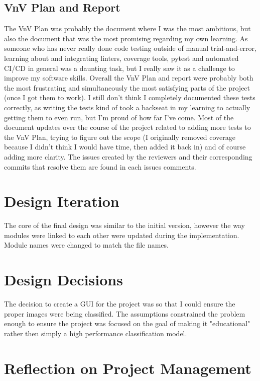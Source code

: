 \documentclass{article}
\begin{document}
\subsection{VnV Plan and Report}

The VnV Plan was probably the document where I was the most ambitious, but also the document that was the most promising
regarding my own learning. As someone who has never really done code testing outside of manual trial-and-error, learning about and integrating
linters, coverage tools, pytest and automated CI/CD in general was a daunting task, but I really saw it as a challenge to improve
my software skills. Overall the VnV Plan and report were probably both the most frustrating and simultaneously the most satisfying parts
of the project (once I got them to work). I still don't think I completely documented these tests correctly, as writing the tests kind of took
a backseat in my learning to actually getting them to even run, but I'm proud of how far I've come.  Most of the document updates over the course of the project related to adding more
tests to the VnV Plan, trying to figure out the scope (I originally removed coverage because I didn't think I would have time, then
added it back in) and of course adding more clarity. The issues created by the reviewers and their corresponding commits that resolve them are found in each issues comments.

\section{Design Iteration}


The core of the final design was similar to the initial version, however the way modules were linked to each other
were updated during the implementation. Module names were changed to match the
file names.

\section{Design Decisions}

The decision to create a GUI for the project was so that I could ensure the proper images were being classified.
The assumptions constrained the problem enough to ensure the project was focused on the goal of making it "educational"
rather then simply a high performance classification model.


\section{Reflection on Project Management}
\end{document}
